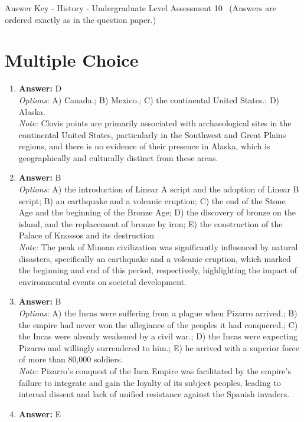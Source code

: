 \documentclass[12pt]{article}
\begin{document}
\begin{center}
Answer Key - History - Undergraduate Level Assessment 10 \
\small (Answers are ordered exactly as in the question paper.)
\end{center}

\section*{Multiple Choice}
\begin{enumerate}[label=\arabic*.]
\item \textbf{Answer:} D
\\ \textit{Options:} A) Canada.; B) Mexico.; C) the continental United States.; D) Alaska.
\\ \textit{Note:} Clovis points are primarily associated with archaeological sites in the continental United States, particularly in the Southwest and Great Plains regions, and there is no evidence of their presence in Alaska, which is geographically and culturally distinct from these areas.
\item \textbf{Answer:} B
\\ \textit{Options:} A) the introduction of Linear A script and the adoption of Linear B script; B) an earthquake and a volcanic eruption; C) the end of the Stone Age and the beginning of the Bronze Age; D) the discovery of bronze on the island, and the replacement of bronze by iron; E) the construction of the Palace of Knossos and its destruction
\\ \textit{Note:} The peak of Minoan civilization was significantly influenced by natural disasters, specifically an earthquake and a volcanic eruption, which marked the beginning and end of this period, respectively, highlighting the impact of environmental events on societal development.
\item \textbf{Answer:} B
\\ \textit{Options:} A) the Incas were suffering from a plague when Pizarro arrived.; B) the empire had never won the allegiance of the peoples it had conquered.; C) the Incas were already weakened by a civil war.; D) the Incas were expecting Pizarro and willingly surrendered to him.; E) he arrived with a superior force of more than 80,000 soldiers.
\\ \textit{Note:} Pizarro's conquest of the Inca Empire was facilitated by the empire's failure to integrate and gain the loyalty of its subject peoples, leading to internal dissent and lack of unified resistance against the Spanish invaders.
\item \textbf{Answer:} E

\end{enumerate}
\end{document}
